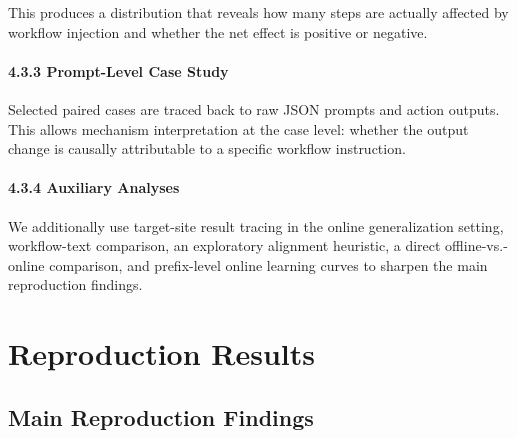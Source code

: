 \documentclass{article}
\begin{document}
This produces a distribution that reveals how many steps are actually
affected by workflow injection and whether the net effect is positive or
negative.

\paragraph{4.3.3 Prompt-Level Case Study}\label{prompt-level-case-study}

Selected paired cases are traced back to raw JSON prompts and action
outputs. This allows mechanism interpretation at the case level: whether
the output change is causally attributable to a specific workflow
instruction.

\paragraph{4.3.4 Auxiliary Analyses}\label{auxiliary-analyses}

We additionally use target-site result tracing in the online
generalization setting, workflow-text comparison, an
exploratory alignment heuristic, a direct offline-vs.-online
comparison, and prefix-level online learning curves to sharpen the main
reproduction findings.

\section{Reproduction Results}\label{reproduction-results}

\subsection{Main Reproduction
Findings}\label{overall-reproduction-status}
\end{document}
